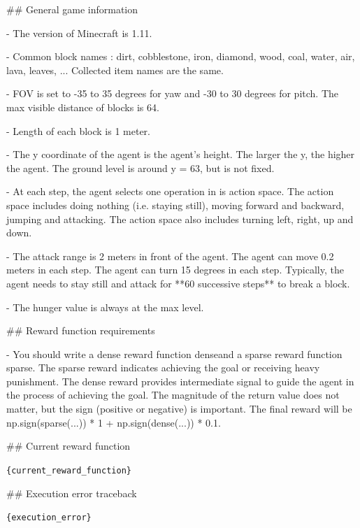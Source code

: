 \#\# General game information

- The version of Minecraft is 1.11.

- Common block names : dirt, cobblestone, iron, diamond, wood, coal, water, air, lava, leaves, ... Collected item names are the same.

- FOV is set to -35 to 35 degrees for yaw and -30 to 30 degrees for pitch. The max visible distance of blocks is 64.

- Length of each block is 1 meter.

- The y coordinate of the agent is the agent's height. The larger the y, the higher the agent. The ground level is around y = 63, but is not fixed.

- At each step, the agent selects one operation in is action space. The action space includes doing nothing (i.e. staying still), moving forward and backward, jumping and attacking. The action space also includes turning left, right, up and down. 

- The attack range is 2 meters in front of the agent. The agent can move 0.2 meters in each step. The agent can turn 15 degrees in each step. Typically, the agent needs to stay still and attack for **60 successive steps** to break a block.

- The hunger value is always at the max level.





\#\# Reward function requirements

- You should write a dense reward function \textasciigrave dense\textasciigrave  and a sparse reward function \textasciigrave sparse\textasciigrave . The sparse reward indicates achieving the goal or receiving heavy punishment. The dense reward provides intermediate signal to guide the agent in the process of achieving the goal. The magnitude of the return value does not matter, but the sign (positive or negative) is important. The final reward will be \textasciigrave np.sign(sparse(...)) * 1 + np.sign(dense(...)) * 0.1\textasciigrave .





\#\# Current reward function

\texttt{\{current\_reward\_function\}}



\#\# Execution error traceback

\textasciigrave \textasciigrave \textasciigrave 

\texttt{\{execution\_error\}}

